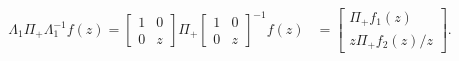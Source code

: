 \documentclass[a4paper,reqno,11pt]{amsart}
\numberwithin{equation}{section}
\numberwithin{figure}{section}
\theoremstyle{plain}
\theoremstyle{remark}
\numberwithin{rhp}{section}
\begin{document}
\begin{align}
        \Lambda_1 \Pi_{+} \Lambda_1^{-1} f(z) = \begin{bmatrix}
       1  & 0 \\
        0 & z
    \end{bmatrix} \Pi_{+} \begin{bmatrix}
       1  & 0 \\
        0 & z
    \end{bmatrix}^{-1} f(z) 
    &=   \begin{bmatrix}
     \Pi_{+} f_1(z) \\
     z \Pi_{+} f_2(z)/z
    \end{bmatrix}  . \label{eq:Lambda1conj}
    \end{align}
\end{document}
